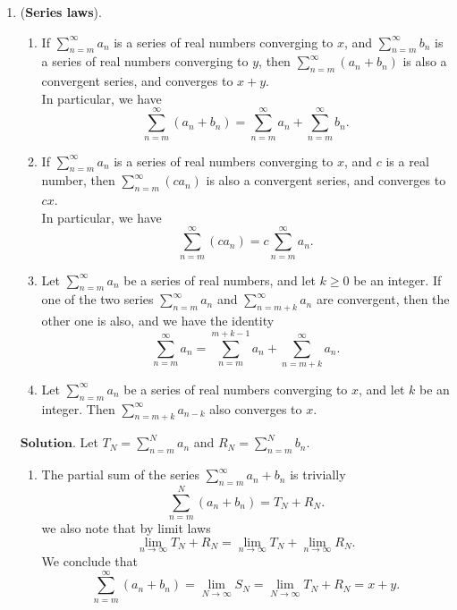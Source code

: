 \documentclass{article}
\theoremstyle{remark}
\begin{document}
\begin{enumerate}
    \item (\textbf{Series laws}).
    \begin{enumerate}
        \item[(a)] If \( \sum_{n=m}^{\infty} a_n \) is a series of real numbers converging to \( x \), and
        \( \sum_{n=m}^{\infty} b_n \) is a series of real numbers converging to \( y \), then
        \( \sum_{n=m}^{\infty} (a_n + b_n) \) is also a convergent series, and converges to \( x + y \).\\
        In particular, we have
        \[
        \sum_{n=m}^{\infty} (a_n + b_n)
        = \sum_{n=m}^{\infty} a_n + \sum_{n=m}^{\infty} b_n.
        \]

        \item[(b)] If \( \sum_{n=m}^{\infty} a_n \) is a series of real numbers converging to \( x \), and
        \( c \) is a real number, then \( \sum_{n=m}^{\infty} (c a_n) \) is also a convergent series, and
        converges to \( cx \).\\
        In particular, we have
        \[
        \sum_{n=m}^{\infty} (c a_n)
        = c \sum_{n=m}^{\infty} a_n.
        \]

        \item[(c)] Let \( \sum_{n=m}^{\infty} a_n \) be a series of real numbers, and let
        \( k \geq 0 \) be an integer. If one of the two series
        \( \sum_{n=m}^{\infty} a_n \) and \( \sum_{n=m+k}^{\infty} a_n \) are convergent,
        then the other one is also, and we have the identity
        \[
            \sum_{n=m}^{\infty} a_n
            = \sum_{n=m}^{m+k-1} a_n + \sum_{n=m+k}^{\infty} a_n.
        \]

        \item[(d)] Let \( \sum_{n=m}^{\infty} a_n \) be a series of real numbers converging to \( x \),
        and let \( k \) be an integer. Then
        \( \sum_{n=m+k}^{\infty} a_{n-k} \) also converges to \( x \).
    \end{enumerate}
    $\textbf{Solution.}$
    Let $T_N = \sum_{n=m}^{N}a_n$ and $R_N = \sum_{n=m}^{N}b_n$.
    \begin{enumerate}
        \item
        The partial sum of the series $\sum_{n=m}^{\infty}a_n+b_n$
        is trivially
        \[
        \sum_{n=m}^{N} (a_n + b_n) =  T_N + R_N.
        \]
        we also note that by limit laws 
        \[
        \lim_{n\to\infty}T_N+R_N = \lim_{n\to\infty}T_N + \lim_{n\to\infty}R_N.
        \]
        We conclude that 
        \[
        \sum_{n=m}^{\infty}(a_n+b_n) = \lim_{N\to\infty} S_N = \lim_{N\to\infty} T_N + R_N = x+y.
        \] 


\end{enumerate}
\end{enumerate}
\end{document}
